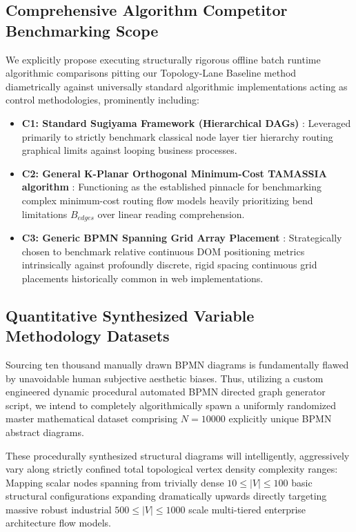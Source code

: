\documentclass[fleqn,10pt]{wlscirep}
\begin{document}
\subsection*{Comprehensive Algorithm Competitor Benchmarking Scope}
We explicitly propose executing structurally rigorous offline batch runtime algorithmic comparisons pitting our Topology-Lane Baseline method diametrically against universally standard algorithmic implementations acting as control methodologies, prominently including:
\begin{itemize}
    \item \textbf{C1: Standard Sugiyama Framework (Hierarchical DAGs)} \cite{Sugiyama1981}: Leveraged primarily to strictly benchmark classical node layer tier hierarchy routing graphical limits against looping business processes.
    \item \textbf{C2: General K-Planar Orthogonal Minimum-Cost TAMASSIA algorithm} \cite{Tamassia1987}: Functioning as the established pinnacle for benchmarking complex minimum-cost routing flow models heavily prioritizing bend limitations $B_{edges}$ over linear reading comprehension.
    \item \textbf{C3: Generic BPMN Spanning Grid Array Placement} \cite{Kitzmann2009}: Strategically chosen to benchmark relative continuous DOM positioning metrics intrinsically against profoundly discrete, rigid spacing continuous grid placements historically common in web implementations.
\end{itemize}

\subsection*{Quantitative Synthesized Variable Methodology Datasets}
Sourcing ten thousand manually drawn BPMN diagrams is fundamentally flawed by unavoidable human subjective aesthetic biases. Thus, utilizing a custom engineered dynamic procedural automated BPMN directed graph generator script, we intend to completely algorithmically spawn a uniformly randomized master mathematical dataset comprising $N=10000$ explicitly unique BPMN abstract diagrams. 

These procedurally synthesized structural diagrams will intelligently, aggressively vary along strictly confined total topological vertex density complexity ranges: 
Mapping scalar nodes spanning from trivially dense $10 \le |V| \le 100$ basic structural configurations expanding dramatically upwards directly targeting massive robust industrial $500 \le |V| \le 1000$ scale multi-tiered enterprise architecture flow models.
\end{document}
